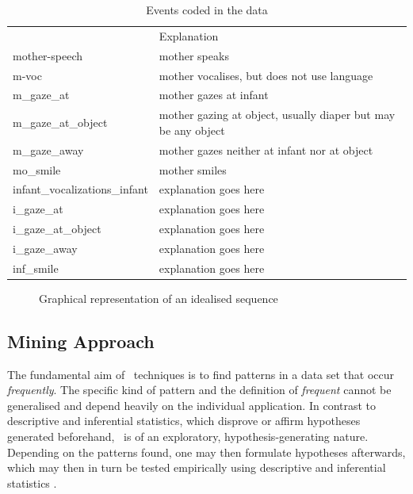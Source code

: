 \begin{table}[h]
	\centering
	\begin{tabularx}{\textwidth}{>{\ttfamily}lX} 
		\toprule
		{\rmfamily Event}			& Explanation \\
		\cmidrule(lr){1-1} \cmidrule(lr){2-2}
		mother-speech					& mother speaks \\
		m-voc							& mother vocalises, but does not use language \\
		m\_gaze\_at						& mother gazes at infant \\
		m\_gaze\_at\_object				& mother gazing at object, usually diaper but may be any object \\
		m\_gaze\_away					& mother gazes neither at infant nor at object \\
		mo\_smile						& mother smiles \\
		\cmidrule(lr){1-1} \cmidrule(lr){2-2}
		infant\_vocalizations\_infant	& explanation goes here \\
		i\_gaze\_at						& explanation goes here \\
		i\_gaze\_at\_object				& explanation goes here \\
		i\_gaze\_away					& explanation goes here \\
		inf\_smile						& explanation goes here \\
		\bottomrule
	\end{tabularx}
	\caption{Events coded in the data}
	\label{tab:events}
\end{table}

\begin{figure}
	\centering
	
	\caption{Graphical representation of an idealised sequence}
	\label{fig:idealseq}
\end{figure}

\subsection{Mining Approach}
\label{ssec:miningmethodapproach}
The fundamental aim of \fpmlower\ techniques is to find patterns in a data set that occur \emph{frequently}. The specific kind of pattern and the definition of \emph{frequent} cannot be generalised and depend heavily on the individual application. In contrast to descriptive and inferential statistics, which disprove or affirm hypotheses generated beforehand, \fpmlower\ is of an exploratory, hypothesis-generating nature. Depending on the patterns found, one may then formulate hypotheses afterwards, which may then in turn be tested empirically using descriptive and inferential statistics \cite[]{rohlfing18,han12}.%

